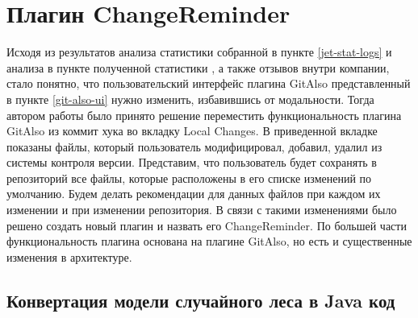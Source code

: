 \section{Плагин ChangeReminder}
Исходя из результатов анализа статистики собранной в пункте \ref{jet-stat-logs} и анализа в пункте полученной статистики
, а также отзывов внутри компании, стало понятно, что пользовательский интерфейс плагина GitAlso представленный в пункте \ref{git-also-ui} нужно изменить, избавившись от модальности. Тогда автором работы было принято решение переместить функциональность плагина GitAlso из коммит хука во вкладку Local Changes. В приведенной вкладке показаны файлы, который пользователь модифицировал, добавил, удалил из системы контроля версии. Представим, что пользователь будет сохранять в репозиторий все файлы, которые расположены в его списке изменений по умолчанию. Будем делать рекомендации для данных файлов при каждом их изменении и при изменении репозитория. В связи с такими изменениями было решено создать новый плагин и назвать его ChangeReminder. По большей части функциональность плагина основана на плагине GitAlso, но есть и существенные изменения в архитектуре.
\subsection{Конвертация модели случайного леса в Java код}
